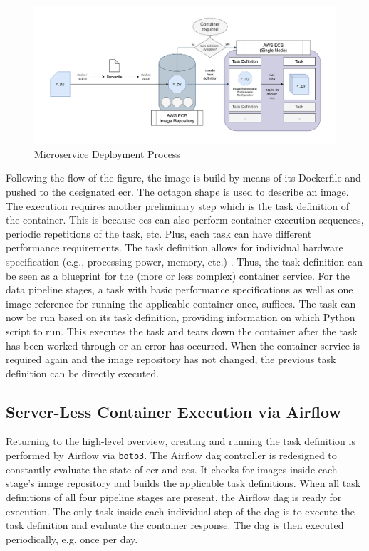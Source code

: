 \begin{figure}[h!]
	\centering
	\includegraphics[width=\linewidth]{main-matter/img/5-container-deployment.pdf}
	\caption{Microservice Deployment Process}
	\label{fig:5-container-deployment}	
\end{figure}

Following the flow of the figure, the image is build by means of its Dockerfile and pushed to the designated \ac{ecr}. The octagon shape is used to describe an image. The execution requires another preliminary step which is the task definition of the container. This is because \ac{ecs} can also perform container execution sequences, periodic repetitions of the task, etc. Plus, each task can have different performance requirements. The task definition allows for individual hardware specification (e.g., processing power, memory, etc.) \cite{ecs}. Thus, the task definition can be seen as a blueprint for the (more or less complex) container service. For the data pipeline stages, a task with basic performance specifications as well as one image reference for running the applicable container once, suffices. The task can now be run based on its task definition, providing information on which Python script to run. This executes the task and tears down the container after the task has been worked through or an error has occurred. When the container service is required again and the image repository has not changed, the previous task definition can be directly executed.

\subsection{Server-Less Container Execution via Airflow}
Returning to the high-level overview, creating and running the task definition is performed by Airflow via \texttt{boto3}. The Airflow \ac{dag} controller is redesigned to constantly evaluate the state of \ac{ecr} and \ac{ecs}. It checks for images inside each stage's image repository and builds the applicable task definitions. When all task definitions of all four pipeline stages are present, the Airflow \ac{dag} is ready for execution. The only task inside each individual step of the \ac{dag} is to execute the task definition and evaluate the container response. The \ac{dag} is then executed periodically, e.g. once per day.

